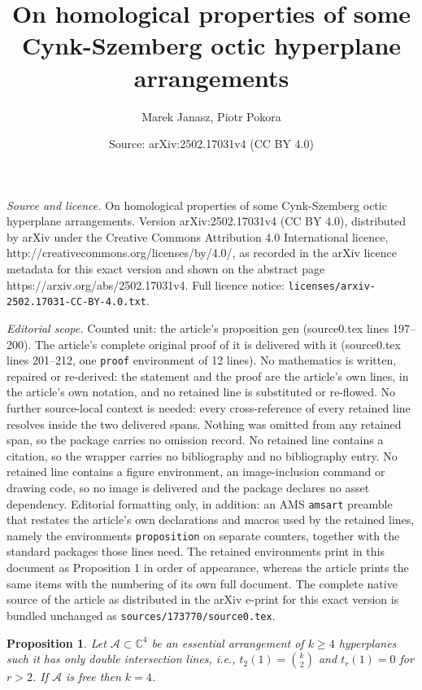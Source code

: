 \documentclass[10pt,a4paper]{amsart}
\title{On homological properties of some Cynk-Szemberg octic hyperplane arrangements}
\author{Marek Janasz, Piotr Pokora}
\date{Source: arXiv:2502.17031v4 (CC BY 4.0)}
\newtheorem{proposition}{Proposition}
\begin{document}
\maketitle

\noindent\emph{Source and licence.} On homological properties of some Cynk-Szemberg octic hyperplane arrangements. Version arXiv:2502.17031v4 (CC BY 4.0), distributed by arXiv under the Creative Commons Attribution 4.0 International licence, http://creativecommons.org/licenses/by/4.0/, as recorded in the arXiv licence metadata for this exact version and shown on the abstract page https://arxiv.org/abs/2502.17031v4. Full licence notice: \texttt{licenses/arxiv-2502.17031-CC-BY-4.0.txt}.\par\smallskip

\noindent\textit{Editorial scope.} Counted unit: the article's proposition gen (source0.tex lines 197--200). The article's complete original proof of it is delivered with it (source0.tex lines 201--212, one \texttt{proof} environment of 12 lines). No mathematics is written, repaired or re-derived: the statement and the proof are the article's own lines, in the article's own notation, and no retained line is substituted or re-flowed.  No further source-local context is needed: every cross-reference of every retained line resolves inside the two delivered spans.  Nothing was omitted from any retained span, so the package carries no omission record.  No retained line contains a citation, so the wrapper carries no bibliography and no bibliography entry.  No retained line contains a figure environment, an image-inclusion command or drawing code, so no image is delivered and the package declares no asset dependency.  Editorial formatting only, in addition: an AMS \texttt{amsart} preamble that restates the article's own declarations and macros used by the retained lines, namely the environments \texttt{proposition} on separate counters, together with the standard packages those lines need.  The retained environments print in this document as Proposition 1 in order of appearance, whereas the article prints the same items with the numbering of its own full document.  The complete native source of the article as distributed in the arXiv e-print for this exact version is bundled unchanged as \texttt{sources/173770/source0.tex}.
\begin{proposition}
\label{gen}
Let $\mathcal{A} \subset \mathbb{C}^{4}$ be an essential arrangement of $k\geq 4$ hyperplanes such it has only double intersection lines, i.e., $t_{2}(1) =\binom{k}{2}$ and $t_{r}(1)=0$ for $r>2$. If $\mathcal{A}$ is free then $k=4$.
\end{proposition}
\end{document}

